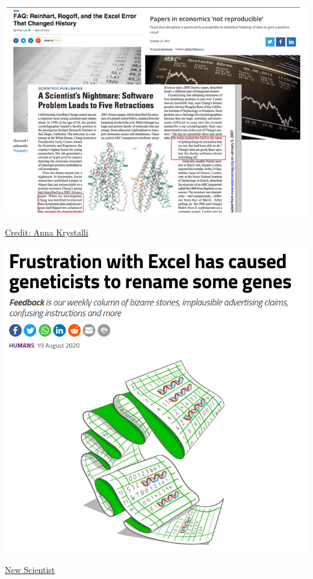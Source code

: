 \documentclass{beamer} %
\begin{document}
  \begin{frame}
    \begin{center}
      \includegraphics[height=.8\textheight]{repro_articles.png}
    \end{center}
    \tiny
    \href{https://annakrystalli.me/rrresearchACCE20/slides/01_intro.html}{Credit: Anna Krystalli}
  \end{frame}

  \begin{frame}
    \begin{center}
      \includegraphics[height=.8\textheight]{new_scientist.png}
    \end{center}
    \href{https://www.newscientist.com/article/mg24732961-400-frustration-with-excel-has-caused-geneticists-to-rename-some-genes/}{New Scientist}
  \end{frame}
\end{document}
